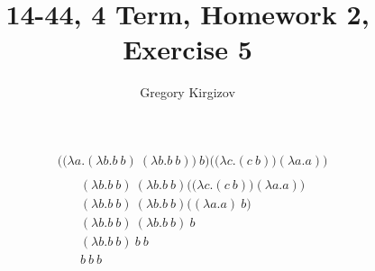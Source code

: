 \documentclass[12pt, leqno]{article}
\author{Gregory Kirgizov}
\title{14-44, 4 Term, Homework 2, Exercise 5}
\date{}
\begin{document}
\maketitle

\begin{align*}
& \Big( \big( \lambda a.( \lambda b.b~b )~( \lambda b.b~b ) \big)~b \Big) \Big( \big( \lambda c.(c~b) \big) ( \lambda a.a) \Big) \\
\end{align*}
\begin{align}
& ( \lambda b.b~b )~( \lambda b.b~b ) \Big( \big( \lambda c.(c~b) \big) ( \lambda a.a) \Big) \\ 
& ( \lambda b.b~b )~( \lambda b.b~b ) \big( ( \lambda a.a)~b \big) \\
& ( \lambda b.b~b )~( \lambda b.b~b )~b \\
& ( \lambda b.b~b )~b~b \\
& b~b~b 
\end{align}
\end{document}
